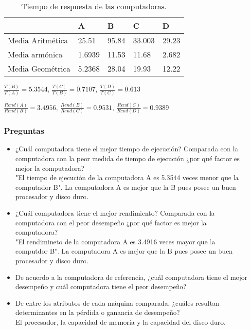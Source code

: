\documentclass[12pt, letterpaper]{article}
\begin{document}
    \begin{table}[htb]
        \centering
        \begin{tabular}{|l|l|l|l|l|}
        \hline
                \hline
                & A & B & C & D \\ \hline
                Media Aritmética & 25.51 & 95.84 & 33.003 & 29.23 \\ \hline
                Media armónica & 1.6939 & 11.53 & 11.68 & 2.682 \\ \hline
                Media Geométrica  & 5.2368 & 28.04 & 19.93 & 12.22 \\ \hline
        \end{tabular}
        \caption{Tiempo de respuesta de las computadoras.}
    \end{table}

    $\frac{T(B)}{T(A)}=5.3544$, $\frac{T(C)}{T(B)}=0.7107$, $\frac{T(D)}{T(C)}=0.613$ \vspace{.2cm}
    
    $\frac{Rend(A)}{Rend(B)}=3.4956$, $\frac{Rend(B)}{Rend(C)}=0.9531$, $\frac{Rend(C)}{Rend(D)}=0.9389$
      \subsubsection*{Preguntas}

      \begin{itemize}
            \item ¿Cuál computadora tiene el mejor tiempo de ejecución? Comparada con la
                computadora con la peor medida de tiempo de ejecución ¿por qué factor es
                 mejor la computadora? \\
                 "El tiempo de ejecución de la computadora A es 5.3544 veces menor que la computador B".
                 La computadora A es mejor que la B pues posee un buen procesador y disco duro.

            \item ¿Cuál computadora tiene el mejor rendimiento? Comparada con la computadora 
                    con el peor desempeño ¿por qué factor es mejor la computadora?\\
                    "El rendimineto de la computadora A es 3.4916 veces mayor que la computdor B".
                    La computadora A es mejor que la B pues posee un buen procesador y disco duro.

            \item De acuerdo a la computadora de referencia, ¿cuál computadora tiene el
                    mejor desempeño y cuál computadora tiene el peor desempeño?

            \item De entre los atributos de cada máquina comparada, ¿cuáles resultan 
                    determinantes en la pérdida o ganancia de desempeño? \\
                    El procesador, la capacidad de memoria y la capacidad del disco duro.
      \end{itemize}
\end{document}
